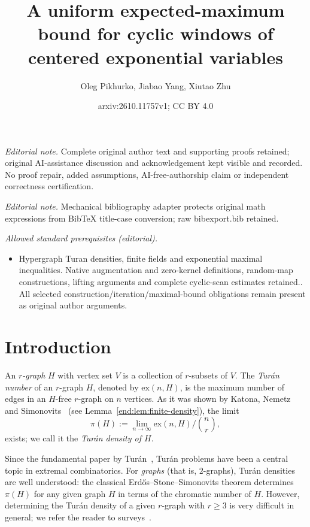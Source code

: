\documentclass[10pt,a4paper]{article}
\title{A uniform expected-maximum bound for cyclic windows of centered exponential variables}
\author{Oleg Pikhurko, Jiabao Yang, Xiutao Zhu}
\date{arxiv:2610.11757v1; CC BY 4.0}
\numberwithin{equation}{section}
\theoremstyle{definition}
\theoremstyle{remark}
\begin{document}
\maketitle
\noindent\textit{Editorial note.} Complete original author text and supporting proofs retained; original AI-assistance discussion and acknowledgement kept visible and recorded. No proof repair, added assumptions, AI-free-authorship claim or independent correctness certification.\par\medskip
\noindent\textit{Editorial note.} Mechanical bibliography adapter protects original math expressions from BibTeX title-case conversion; raw bibexport.bib retained.\par\medskip
\noindent\textit{Allowed standard prerequisites (editorial).}\begin{itemize}
\item Hypergraph Turan densities, finite fields and exponential maximal inequalities. Native augmentation and zero-kernel definitions, random-map constructions, lifting arguments and complete cyclic-scan estimates retained.. All selected construction/iteration/maximal-bound obligations remain present as original author arguments.
\end{itemize}\medskip
\section{Introduction}

An \emph{$r$-graph} $H$ with vertex set $V$ is a collection of $r$-subsets of $V$. The {\em Tur\'{a}n number} of an $r$-graph $H$, denoted by $\mathrm{ex}(n,H)$, is the maximum number of edges in an $H$-free $r$-graph on $n$ vertices. 
As it was shown by Katona, Nemetz and Simonovits~\cite{KatonaNemetzSimonovits64} (see Lemma~\ref{end:lem:finite-density}), the limit
\[
\pi(H):=\lim_{n\to\infty} \mathrm{ex}(n,H)/\binom {n}{r},
\]
 exists; we call it the \emph{Tur\'an density of $H$}.

Since the fundamental paper by Tur\'an~\cite{Turan41}, Tur\'an problems have been a central topic in extremal combinatorics. For \emph{graphs} (that is, $2$-graphs), Tur\'an densities are well understood: the classical Erd\H{o}s--Stone--Simonovits theorem \cite{ErdosStone46,ErdosSimonovits66} determines $\pi(H)$ for any given graph $H$ in terms of the chromatic number of $H$. However, determining the Tur\'an density of a given $r$-graph with $r\ge 3$ is very difficult in general; we refer the reader to surveys~\cite{Furedi91,Decaen94,Sidorenko95,Keevash11}. 
\end{document}
